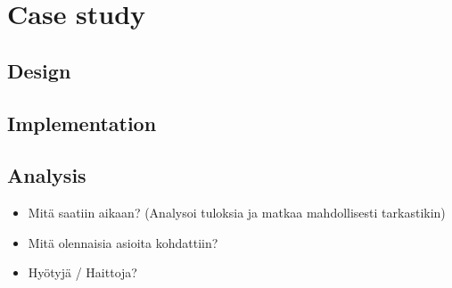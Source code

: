 \chapter{Case study}
\section{Design}

\section{Implementation}

\section{Analysis}
\begin{itemize}
    \item Mitä saatiin aikaan? (Analysoi tuloksia ja matkaa mahdollisesti tarkastikin)
    \item Mitä olennaisia asioita kohdattiin?
    \item Hyötyjä / Haittoja?
\end{itemize}
    